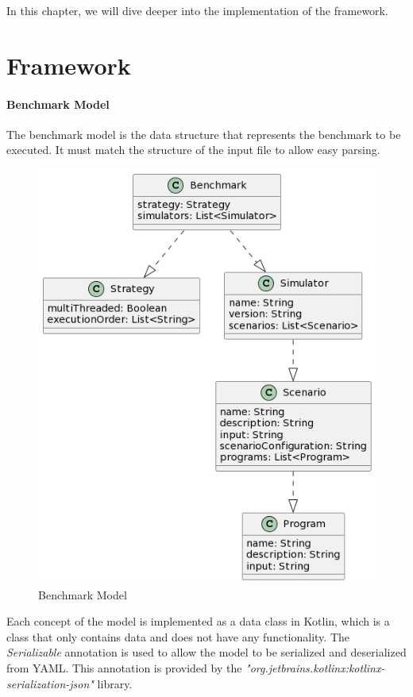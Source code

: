 \documentclass[12pt,a4paper,openright,twoside]{book}
\begin{document}
In this chapter, we will dive deeper into the implementation of the framework.

\section{Framework}

\paragraph*{Benchmark Model}
The benchmark model is the data structure that represents the benchmark to be executed.
It must match the structure of the input file to allow easy parsing.

\begin{figure}[h!]
  \centering
  \includegraphics[width=\textwidth]{figures/benchmark-model.png}
  \caption{Benchmark Model}
  \label{fig:benchmark-model}
\end{figure}

Each concept of the model is implemented as a data class in Kotlin, which is a class that only contains data and does not have any functionality.
The \emph{Serializable} annotation is used to allow the model to be serialized and deserialized from YAML.
This annotation is provided by the \emph{"org.jetbrains.kotlinx:kotlinx-serialization-json"} library.
\end{document}
